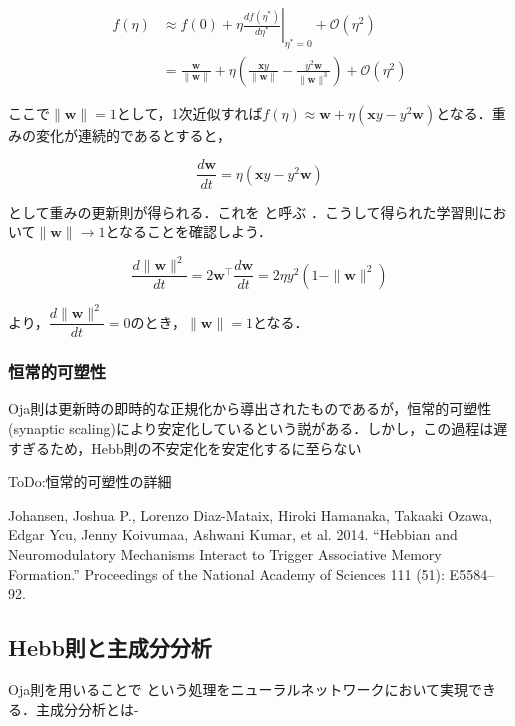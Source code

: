 \begin{align}
f(\eta)&\approx f(0) + \eta \left.\frac{df(\eta^*)}{d\eta^*}\right|_{\eta^*=0} + \mathcal{O}(\eta^2)\\
&=\frac{\mathbf{w}}{\|\mathbf{w}\|} + \eta \left(\frac{\mathbf{x}y}{\|\mathbf{w}\|}-\frac{y^2\mathbf{w}}{\|\mathbf{w}\|^3}\right)+ \mathcal{O}(\eta^2)
\end{align}


ここで$\|\mathbf{w}\|=1$として，1次近似すれば$f(\eta)\approx \mathbf{w} + \eta \left(\mathbf{x}y-y^2 \mathbf{w}\right)$となる．重みの変化が連続的であるとすると，


\begin{equation}
\frac{d\mathbf{w}}{dt} = \eta \left(\mathbf{x}y-y^2 \mathbf{w}\right)
\end{equation}


として重みの更新則が得られる．これを\textbf{} と呼ぶ \cite{Oja1982-yd}．こうして得られた学習則において$\|\mathbf{w}\|\to 1$となることを確認しよう．


\begin{equation}
\frac{d\|\mathbf{w}\|^2}{dt}=2\mathbf{w}^\top\frac{d\mathbf{w}}{dt}= 2\eta y^2\left(1-\|\mathbf{w}\|^2\right)
\end{equation}


より，$\dfrac{d\|\mathbf{w}\|^2}{dt}=0$のとき，$\|\mathbf{w}\|= 1$となる．
\subsubsection{恒常的可塑性}
Oja則は更新時の即時的な正規化から導出されたものであるが，恒常的可塑性 (synaptic scaling)により安定化しているという説がある\cite{Turrigiano2008-lm}\cite{Yee2017-fb}．しかし，この過程は遅すぎるため，Hebb則の不安定化を安定化するに至らない\cite{Zenke2017-el}

ToDo:恒常的可塑性の詳細

Johansen, Joshua P., Lorenzo Diaz-Mataix, Hiroki Hamanaka, Takaaki Ozawa, Edgar Ycu, Jenny Koivumaa, Ashwani Kumar, et al. 2014. “Hebbian and Neuromodulatory Mechanisms Interact to Trigger Associative Memory Formation.” Proceedings of the National Academy of Sciences 111 (51): E5584–92.
\subsection{Hebb則と主成分分析}
Oja則を用いることで\textbf{} という処理をニューラルネットワークにおいて実現できる．主成分分析とは-


